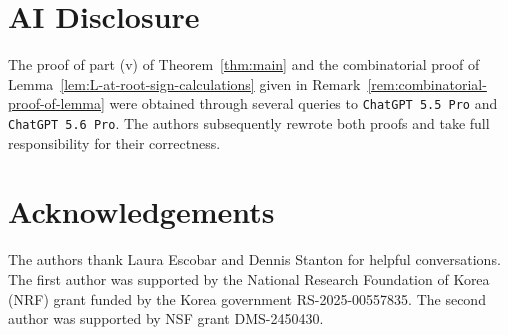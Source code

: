 \documentclass[10pt]{amsart}
\theoremstyle{plain}
\begin{document}
\section*{AI Disclosure}
The proof of part (v) of Theorem~\ref{thm:main} and the combinatorial
proof of Lemma~\ref{lem:L-at-root-sign-calculations} given in
Remark~\ref{rem:combinatorial-proof-of-lemma} were obtained through
several queries to {\tt ChatGPT 5.5 Pro} and {\tt ChatGPT 5.6 Pro}.
The authors subsequently rewrote both proofs and take full responsibility for their correctness.


\section*{Acknowledgements}
The authors thank Laura Escobar and Dennis Stanton for helpful conversations.
The first author was supported by the National Research Foundation of Korea (NRF) grant funded by the Korea government RS-2025-00557835.
The second author was supported by NSF grant DMS-2450430.




%
%
%
%

\end{document}
